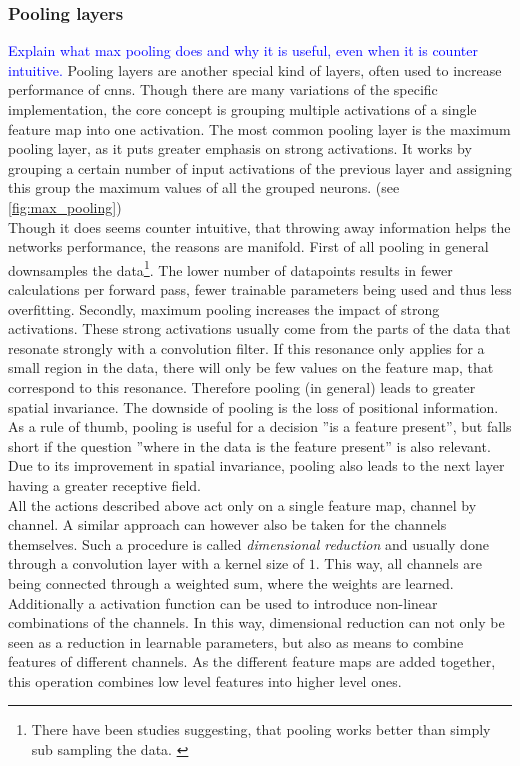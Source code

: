 \subsubsection{Pooling layers}\label{sec:pooling_layers}
\textcolor{blue}{Explain what max pooling does and why it is useful, even when it is counter intuitive.}
Pooling layers are another special kind of layers, often used to increase performance of \gls{cnns}. Though there are many variations of the specific implementation, the core concept is grouping multiple activations of a single feature map into one activation. The most common pooling layer is the maximum pooling layer, as it puts greater emphasis on strong activations. \cite{max_pooling_invention} It works by grouping a certain number of input activations of the previous layer and assigning this group the maximum values of all the grouped neurons. (see \autoref{fig:max_pooling})\\
Though it does seems counter intuitive, that throwing away information helps the networks performance, the reasons are manifold. First of all pooling in general downsamples the data\footnote{There have been studies suggesting, that pooling works better than simply sub sampling the data. \cite{pooling_vs_subsampling}}. The lower number of datapoints results in fewer calculations per forward pass, fewer trainable parameters being used and thus less overfitting. Secondly, maximum pooling increases the impact of strong activations. These strong activations usually come from the parts of the data that resonate strongly with a convolution filter. If this resonance only applies for a small region in the data, there will only be few values on the feature map, that correspond to this resonance. Therefore pooling (in general) leads to greater spatial invariance. The downside of pooling is the loss of positional information. As a rule of thumb, pooling is useful for a decision ''is a feature present'', but falls short if the question ''where in the data is the feature present'' is also relevant.\\
Due to its improvement in spatial invariance, pooling also leads to the next layer having a greater receptive field.\medskip\\
All the actions described above act only on a single feature map, channel by channel. A similar approach can however also be taken for the channels themselves. Such a procedure is called \emph{dimensional reduction} and usually done through a convolution layer with a kernel size of $1$. This way, all channels are being connected through a weighted sum, where the weights are learned.\cite{dim_red_invention} Additionally a activation function can be used to introduce non-linear  combinations of the channels. In this way, dimensional reduction can not only be seen as a reduction in learnable parameters, but also as means to combine features of different channels. \cite{dim_red_interpretation} As the different feature maps are added together, this operation combines low level features into higher level ones.\\
